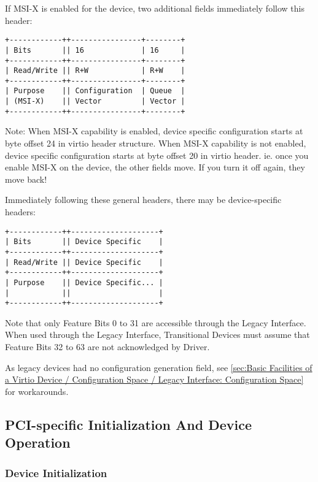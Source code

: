 If MSI-X is enabled for the device, two additional fields
immediately follow this header:


\begin{verbatim}
+------------++----------------+--------+
| Bits       || 16             | 16     |
+------------++----------------+--------+
| Read/Write || R+W            | R+W    |
+------------++----------------+--------+
| Purpose    || Configuration  | Queue  |
| (MSI-X)    || Vector         | Vector |
+------------++----------------+--------+
\end{verbatim}

Note: When MSI-X capability is enabled, device specific configuration starts at
byte offset 24 in virtio header structure. When MSI-X capability is not
enabled, device specific configuration starts at byte offset 20 in virtio
header.  ie. once you enable MSI-X on the device, the other fields move.
If you turn it off again, they move back!

Immediately following these general headers, there may be
device-specific headers:

\begin{verbatim}
+------------++--------------------+
| Bits       || Device Specific    |
+------------++--------------------+
| Read/Write || Device Specific    |
+------------++--------------------+
| Purpose    || Device Specific... |
|            ||                    |
+------------++--------------------+
\end{verbatim}

Note that only Feature Bits 0 to 31 are accessible through the
Legacy Interface. When used through the Legacy Interface,
Transitional Devices must assume that Feature Bits 32 to 63
are not acknowledged by Driver.

As legacy devices had no configuration generation field,
see \ref{sec:Basic Facilities of a Virtio Device / Configuration Space / Legacy Interface: Configuration Space}~ for workarounds.

\subsection{PCI-specific Initialization And Device Operation}\label{sec:Virtio Transport Options / Virtio Over PCI Bus / PCI-specific Initialization And Device Operation}

\subsubsection{Device Initialization}\label{sec:Virtio Transport Options / Virtio Over PCI Bus / PCI-specific Initialization And Device Operation / Device Initialization}

